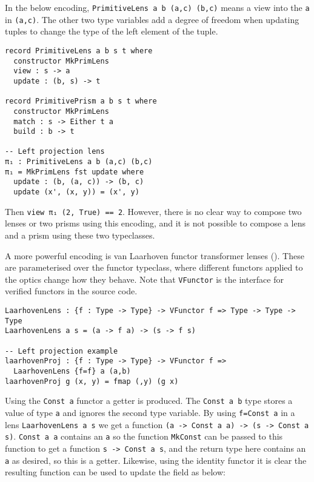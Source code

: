 \documentclass[11pt]{report}
\begin{document}
\begin{spacing}{1.15}
In the below encoding, \texttt{PrimitiveLens a b (a,c) (b,c)} means a view into the \texttt{a} in \texttt{(a,c)}. The other two type variables add a degree of freedom when updating tuples to change the type of the left element of the tuple.

\begin{verbatim}
record PrimitiveLens a b s t where
  constructor MkPrimLens
  view : s -> a
  update : (b, s) -> t

record PrimitivePrism a b s t where
  constructor MkPrimLens
  match : s -> Either t a
  build : b -> t

-- Left projection lens
π₁ : PrimitiveLens a b (a,c) (b,c)
π₁ = MkPrimLens fst update where
  update : (b, (a, c)) -> (b, c)
  update (x', (x, y)) = (x', y)
\end{verbatim}

Then \texttt{view π₁ (2, True) == 2}. However, there is no clear way to compose two lenses or two prisms using this encoding, and it is not possible to compose a lens and a prism using these two typeclasses.

A more powerful encoding is van Laarhoven functor transformer lenses (\cite{laarhoven2011lens}). These are parameterised over the functor typeclass, where different functors applied to the optics change how they behave. Note that \texttt{VFunctor} is the interface for verified functors in the source code.

\begin{verbatim}
LaarhovenLens : {f : Type -> Type} -> VFunctor f => Type -> Type -> Type
LaarhovenLens a s = (a -> f a) -> (s -> f s)

-- Left projection example
laarhovenProj : {f : Type -> Type} -> VFunctor f =>
  LaarhovenLens {f=f} a (a,b)
laarhovenProj g (x, y) = fmap (,y) (g x)
\end{verbatim}

Using the \texttt{Const a} functor a getter is produced. The \texttt{Const a b} type stores a value of type \texttt{a} and ignores the second type variable. By using \texttt{f=Const a} in a lens \texttt{LaarhovenLens a s} we get a function \texttt{(a -> Const a a) -> (s -> Const a s)}. \texttt{Const a a} contains an \texttt{a} so the function \texttt{MkConst} can be passed to this function to get a function \texttt{s -> Const a s}, and the return type here contains an \texttt{a} as desired, so this is a getter. Likewise, using the identity functor it is clear the resulting function can be used to update the field as below:


\end{spacing}
\end{document}
